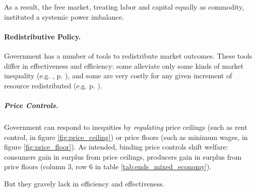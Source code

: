 As a result, the free market, treating labor and capital equally as commodity, instituted a systemic power imbalance.	


\paragraph{Redistributive Policy.}  \label{sec:redistributive_policy} Government has a number of tools to redistribute market outcomes. These tools differ in effectiveness and efficiency: some alleviate only some kinds of market inequality (e.g. ,  p. \pageref{sec:affirmative_action}), and some are very costly for any given increment of resource redistributed (e.g.  p. \pageref{sec:price_controls}).

\subparagraph{Price Controls.}  \label{sec:price_controls} Government can respond to inequities by \emph{regulating} price ceilings (such as rent control, in figure \ref{fig:price_ceiling}) or price floors (such as minimum wages, in figure \ref{fig:price_floor}). As intended, binding price controls shift welfare: consumers gain in surplus from price ceilings, producers gain in surplus from price floors (column 3, row 6 in table \ref{tab:ends_mixed_economy}).

But they gravely lack in efficiency and effectiveness.

